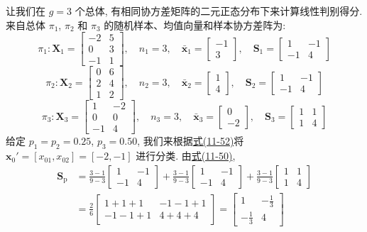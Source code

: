 让我们在 $g=3$ 个总体, 有相同协方差矩阵的二元正态分布下来计算线性判别得分. 来自总体 $\pi_1$, $\pi_2$ 和 $\pi_3$ 的随机样本、均值向量和样本协方差阵为:
\[
\pi_1:\mathbf{X}_1=\begin{bmatrix}-2&5\\0&3\\-1&1\end{bmatrix},\quad n_1=3,\quad \bar{\mathbf{x}}_1=\begin{bmatrix}-1\\3\end{bmatrix},\quad \mathbf{S}_1=\begin{bmatrix}1&-1\\-1&4\end{bmatrix}
\]
\[
\pi_2:\mathbf{X}_2=\begin{bmatrix}0&6\\2&4\\1&2\end{bmatrix},\quad n_2=3,\quad \bar{\mathbf{x}}_2=\begin{bmatrix}1\\4\end{bmatrix},\quad \mathbf{S}_2=\begin{bmatrix}1&-1\\-1&4\end{bmatrix}
\]
\[
\pi_3:\mathbf{X}_3=\begin{bmatrix}1&-2\\0&0\\-1&4\end{bmatrix},\quad n_3=3,\quad \bar{\mathbf{x}}_3=\begin{bmatrix}0\\-2\end{bmatrix},\quad \mathbf{S}_3=\begin{bmatrix}1&1\\1&4\end{bmatrix}
\]
给定 $p_1=p_2=0.25$, $p_3=0.50$, 我们来根据\hyperref[eq:11-52]{式(11-52)}将 $\mathbf{x}_0'=[x_{01},x_{02}]=[-2,-1]$ 进行分类. 由\hyperref[eq:11-50]{式(11-50)},
\[
\begin{aligned}
\mathbf{S}_{\mathrm{p}}&=\frac{3-1}{9-3}\begin{bmatrix}1&-1\\-1&4\end{bmatrix}+\frac{3-1}{9-3}\begin{bmatrix}1&-1\\-1&4\end{bmatrix}+\frac{3-1}{9-3}\begin{bmatrix}1&1\\1&4\end{bmatrix}\\
&=\frac{2}{6}\begin{bmatrix}1+1+1&-1-1+1\\-1-1+1&4+4+4\end{bmatrix}=\begin{bmatrix}1&-\frac{1}{3}\\-\frac{1}{3}&4\end{bmatrix}
\end{aligned}
\]
